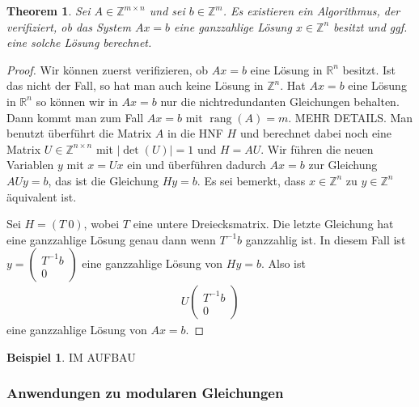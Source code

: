 \documentclass[
a4paper,12pt,
bibliography=totocnumbered,
numbers=noenddot,
]{scrartcl}
\numberwithin{equation}{subsection}
\newcommand{\Z}{\mathbb Z}
\newcommand{\R}{\mathbb R}
\newcommand{\rang}{\operatorname{rang}} %
\theoremstyle{plain}
\newtheorem*{thm}{Theorem}
\theoremstyle{definition}
\newtheorem*{bsp}{Beispiel}
\begin{document}
\begin{thm}
	Sei $A \in \Z^{m \times n}$ und sei $b \in \Z^m$. Es existieren ein Algorithmus, der verifiziert, ob das System $A x =b$ eine ganzzahlige Lösung $x \in \Z^n$ besitzt und ggf. eine solche Lösung berechnet. 
\end{thm} 
\begin{proof}
	Wir können zuerst verifizieren, ob $A x =b$ eine Lösung in $\R^n$ besitzt. Ist das nicht der Fall, so hat man auch keine Lösung in $\Z^n$. Hat $A x= b$ eine Lösung in $\R^n$ so können wir in $A x=b$ nur die nichtredundanten Gleichungen behalten. Dann kommt man zum Fall $A x =b$ mit $\rang(A) = m$. MEHR DETAILS. Man benutzt überführt die Matrix $A$ in die HNF $H$ und berechnet dabei noch eine Matrix $U \in \Z^{n \times n}$ mit $|\det(U)|=1$ und $H = A U$. Wir führen die neuen Variablen $y$ mit $x = U x$ ein und überführen dadurch $A x =b$ zur Gleichung $A U y = b$, das ist die Gleichung $H y = b$. Es sei bemerkt, dass $x \in \Z^n$ zu $y \in \Z^n$ äquivalent ist. 
	
	Sei $H  = (T \  0)$, wobei $T$ eine untere Dreiecksmatrix. Die letzte Gleichung hat eine ganzzahlige Lösung genau dann wenn $T^{-1} b$ ganzzahlig ist. In diesem Fall ist $y = \begin{pmatrix} T^{-1} b \\ 0 \end{pmatrix}$ eine ganzzahlige Lösung von $H y =b$. Also ist 
	\begin{align*}
			U \begin{pmatrix} T^{-1} b \\ 0 \end{pmatrix} 
	\end{align*}
	eine ganzzahlige Lösung von $A x= b$. 
\end{proof} 

\begin{bsp}
	IM AUFBAU 
\end{bsp} 

\subsubsection{Anwendungen zu modularen Gleichungen} 
\end{document}
